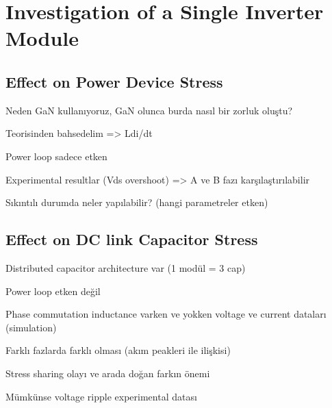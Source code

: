 \section{Investigation of a Single Inverter Module}
\label{chap:curr_driven_rect}

\subsection{Effect on Power Device Stress}

Neden GaN kullanıyoruz, GaN olunca burda nasıl bir zorluk oluştu?

Teorisinden bahsedelim => Ldi/dt

Power loop sadece etken

Experimental resultlar (Vds overshoot) => A ve B fazı karşılaştırılabilir

Sıkıntılı durumda neler yapılabilir? (hangi parametreler etken)

\subsection{Effect on DC link Capacitor Stress}

Distributed capacitor architecture var (1 modül = 3 cap)

Power loop etken değil

Phase commutation inductance varken ve yokken voltage ve current dataları (simulation)

Farklı fazlarda farklı olması (akım peakleri ile ilişkisi)

Stress sharing olayı ve arada doğan farkın önemi

Mümkünse voltage ripple experimental datası

